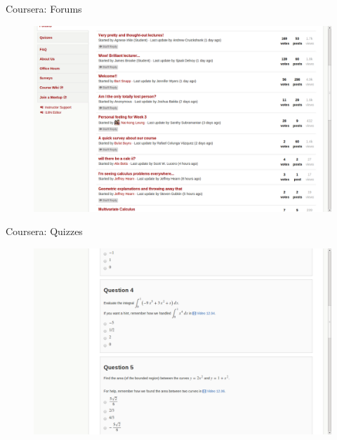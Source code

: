\documentclass[serif,mathserif,final]{beamer}
\title{\mdseries{Calculus\&}\mooculus}
\author{Jim Fowler, Steve Gubkin, and Bart Snapp}
\institute{The Ohio State University}
\begin{document}
{
\begin{frame}{}
  \begin{columns}[t]

    \begin{column}{0.32\linewidth}

      \begin{block}{Coursera: Forums}
        \begin{figure}[htb]
          \centering
          \includegraphics[width=.9\columnwidth]{forum}
        \end{figure}
        \end{block}

      \begin{block}{Coursera: Quizzes}
        \begin{figure}[htb]
          \centering
          \includegraphics[width=.9\columnwidth]{quiz}
        \end{figure}
      \end{block}



\end{column}
\end{columns}
\end{frame}}
\end{document}
